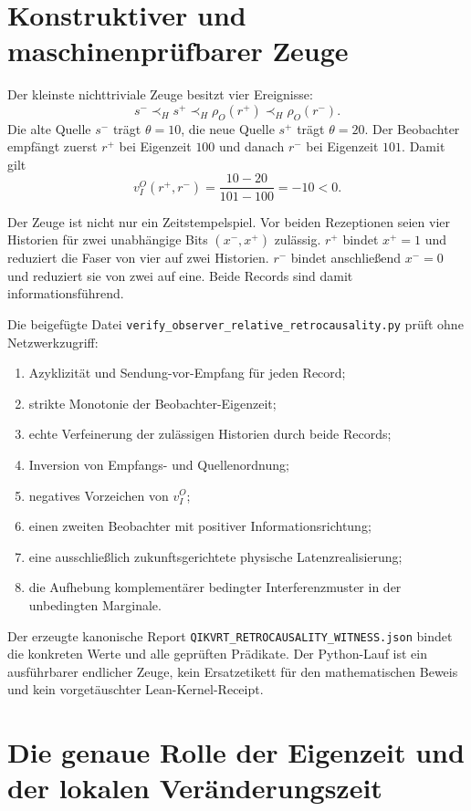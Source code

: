 \documentclass[11pt,a4paper]{article}
\theoremstyle{remark}
\newcommand{\host}{\prec_{\!H}}
\begin{document}
\section{Konstruktiver und maschinenprüfbarer Zeuge}
\label{sec:witness}

Der kleinste nichttriviale Zeuge besitzt vier Ereignisse:
\[
  s^-\host s^+\host\rho_O(r^+)\host\rho_O(r^-).
\]
Die alte Quelle \(s^-\) trägt \(\theta=10\), die neue Quelle \(s^+\) trägt
\(\theta=20\). Der Beobachter empfängt zuerst \(r^+\) bei Eigenzeit \(100\)
und danach \(r^-\) bei Eigenzeit \(101\). Damit gilt
\[
  v_I^O(r^+,r^-)=\frac{10-20}{101-100}=-10<0.
\]

Der Zeuge ist nicht nur ein Zeitstempelspiel. Vor beiden Rezeptionen seien
vier Historien für zwei unabhängige Bits \((x^-,x^+)\) zulässig. \(r^+\)
bindet \(x^+=1\) und reduziert die Faser von vier auf zwei Historien.
\(r^-\) bindet anschließend \(x^-=0\) und reduziert sie von zwei auf eine.
Beide Records sind damit informationsführend.

Die beigefügte Datei
\texttt{verify\_observer\_relative\_retrocausality.py} prüft ohne
Netzwerkzugriff:

\begin{enumerate}
  \item Azyklizität und Sendung-vor-Empfang für jeden Record;
  \item strikte Monotonie der Beobachter-Eigenzeit;
  \item echte Verfeinerung der zulässigen Historien durch beide Records;
  \item Inversion von Empfangs- und Quellenordnung;
  \item negatives Vorzeichen von \(v_I^O\);
  \item einen zweiten Beobachter mit positiver Informationsrichtung;
  \item eine ausschließlich zukunftsgerichtete physische Latenzrealisierung;
  \item die Aufhebung komplementärer bedingter Interferenzmuster in der
  unbedingten Marginale.
\end{enumerate}

Der erzeugte kanonische Report
\texttt{QIKVRT\_RETROCAUSALITY\_WITNESS.json} bindet die konkreten Werte und
alle geprüften Prädikate. Der Python-Lauf ist ein ausführbarer endlicher
Zeuge, kein Ersatzetikett für den mathematischen Beweis und kein vorgetäuschter
Lean-Kernel-Receipt.

\section{Die genaue Rolle der Eigenzeit und der lokalen Veränderungszeit}
\end{document}
